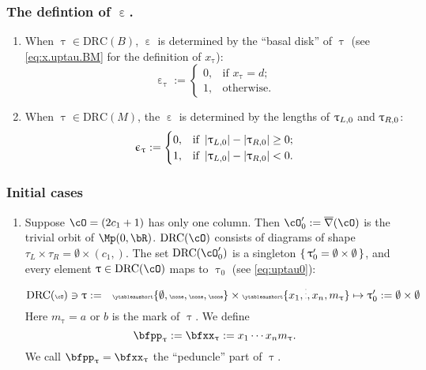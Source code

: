 \documentclass[12pt,a4paper]{amsart}
\def\abs#1{\left|{#1}\right|}
\def\eDD{\overline{\nabla}}
\numberwithin{equation}{section}
\theoremstyle{remark}
\def\drc{\mathrm{DRC}}
\let\ytb=\ytableaushort
\def\cOp{\cO^{\prime}}
\def\uptaup{\uptau^{\prime}}
\begin{document}
\subsubsection{The defintion of $\upepsilon$.} \label{sec:upepsilon.BM}
\begin{enumerate}[label=(\arabic*).,series=alg2]
  \item When $\uptau\in \drc(B)$, $\upepsilon$ is determined by the ``basal
  disk'' of $\uptau$ (see \eqref{eq:x.uptau.BM} for the definition of $x_{\uptau}$):
  \[
    \upepsilon_{\uptau}:=
    \begin{cases}
      0, & \text{if $x_{\uptau}=d$;} \\
      1, & \text{otherwise.}
    \end{cases}
  \]
  \item When $\uptau\in \drc(M)$, the  $\upepsilon$  is determined by
  the lengths of $\uptau_{L,0}$ and $\uptau_{R,0}$:
  \[
    \upepsilon_{\uptau} :=
    \begin{cases}
      0, & \text{if }\abs{\taulf} - \abs{\taurf} \geq  0;\\
      1, & \text{if }\abs{\taulf} - \abs{\taurf}<0.
    \end{cases}
  \]
\end{enumerate}


\subsubsection{Initial cases}

\begin{enumerate}[resume*=alg2]
  \item Suppose $\cO = (2c_{1}+1)$ has only one column. Then
        $\cOp_{0}:=\eDD(\cO)$ is the trivial orbit of $\Mp(0,\bR)$. $\drc(\cO)$
        consists of diagrams of shape
        $\tau_{L}\times \tau_{R} =\emptyset\times (c_{1},)$.
        The set $\drc(\cOp_{0})$ is a singleton $\set{\uptaup_{0}=\emptyset\times \emptyset}$, and every element
        $\uptau \in \drc(\cO)$ maps to $\uptau_{0}$ (see \eqref{eq:uptau0}):
        \[\tiny
          \drc(\cO)\ni \uptau:= \hspace{1em} \ytb{\emptyset,\none,\none,\none}
          \times \ytb{{x_{1}},\vdots,{x_{n}},{m_{\uptau}}}
          \mapsto \uptaup_{0}:=\emptyset\times \emptyset
        \]
        Here $m_{\uptau}=a$ or $b$ is the mark of $\uptau$.
        We define
        \[
          \bfpp_{\uptau}:=\bfxx_{\uptau} := x_{1}\cdots x_{n} m_{\uptau}.%
        \]
        We call $\bfpp_{\uptau}=\bfxx_{\uptau}$ the ``peduncle'' part of
        $\uptau$.
\end{enumerate}
\end{document}

